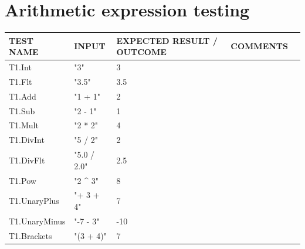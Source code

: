 \documentclass[a4paper, oneside, 11pt]{report}
\begin{document}
    \section{Arithmetic expression testing}
    \label{ArithTest}
    \begin{tabular}{|p{1.5in}|p{1.5in}|p{1.6in}|p{1.6in}|p{2.4in}|}
        \hline
        TEST NAME       & INPUT                     & EXPECTED RESULT / OUTCOME              & COMMENTS                                \\
        \hline
        T1.Int          & "3"                       & 3                                      &                                         \\
        \hline
        T1.Flt          & "3.5"                     & 3.5                                    &                                         \\
        \hline
        T1.Add          & "1 + 1"                   & 2                                      &                                         \\
        \hline
        T1.Sub          & "2 - 1"                   & 1                                      &                                         \\
        \hline
        T1.Mult         & "2 * 2"                   & 4                                      &                                         \\
        \hline
        T1.DivInt          & "5 / 2"                   & 2                                      &                                         \\
        \hline
        T1.DivFlt          & "5.0 / 2.0"                   & 2.5                                     &                                         \\
        \hline
        T1.Pow          & "2 \^{} 3"                & 8                                      &                                         \\
        \hline
        T1.UnaryPlus    & "+ 3 + 4"                 & 7                                      &                                         \\
        \hline
        T1.UnaryMinus   & "-7 - 3"                   & -10                                    &                                         \\
        \hline
        T1.Brackets     & "(3 + 4)"                 & 7                                      &                                         \\

\end{tabular}
\end{document}
